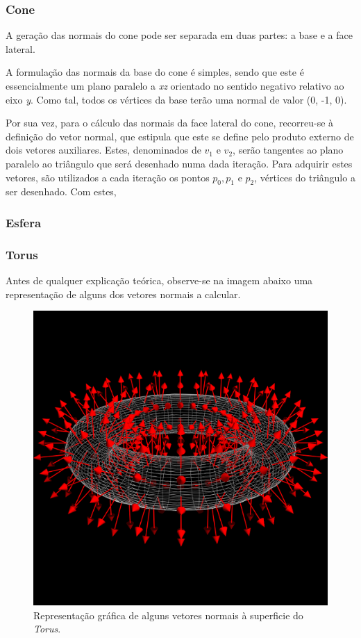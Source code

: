 \documentclass[a4paper]{article}
\begin{document}
\subsubsection{Cone}%

\hspace{3mm} A geração das normais do cone pode ser separada em duas partes: a base e a face lateral. 

A formulação das normais da base do cone é simples, sendo que este é essencialmente um plano paralelo a \textit{xz} orientado no sentido negativo relativo ao eixo \textit{y}. Como tal, todos os vértices da base terão uma normal de valor (0, -1, 0).

Por sua vez, para o cálculo das normais da face lateral do cone, recorreu-se à definição do vetor normal, que estipula que este se define pelo produto externo de dois vetores auxiliares. Estes, denominados de $v_1$ e $v_2$, serão tangentes ao plano paralelo ao triângulo que será desenhado numa dada iteração. Para adquirir estes vetores, são utilizados a cada iteração os pontos $p_0, p_1$ e $p_2$, vértices do triângulo a ser desenhado. Com estes, %

\subsubsection{Esfera}%
\subsubsection{Torus} %

\hspace{3mm} Antes de qualquer explicação teórica, observe-se na imagem abaixo uma representação de alguns dos vetores normais a calcular.

\begin{figure}[!h]
    \centering
    \includegraphics[width=0.5\linewidth]{TorusNormalVector.png}
    \caption{Representação gráfica de alguns vetores normais à superficie do \textit{Torus}.}
    \label{fig:ref_normalTorus}
\end{figure}
\end{document}
